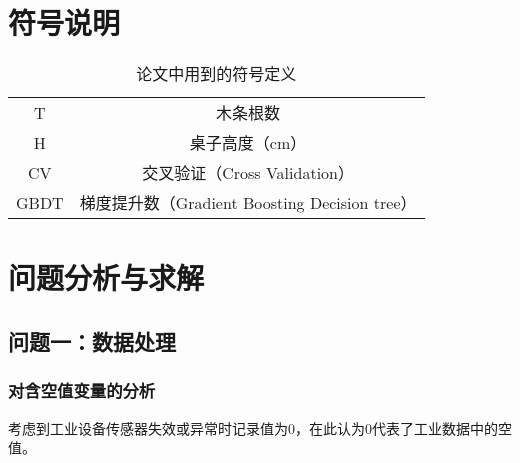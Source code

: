 \documentclass[bwprint]{gmcmthesis}
\begin{document}
\FloatBarrier
\section{符号说明}


\begin{table}[hp]
    \centering
    \caption{论文中用到的符号定义}
	\begin{tabular}{cc}
	\toprule
	 \makebox[0.4\textwidth][c]{符号}	&  \makebox[0.5\textwidth][c]{意义} \\ 
	 \midrule
	 T	    & 木条根数   \\
	 H	    & 桌子高度（cm）  \\
	 \midrule
	 CV	    & 交叉验证（Cross Validation） \\
	 GBDT	& 梯度提升数（Gradient Boosting Decision tree）  \\ 
	 \bottomrule
	\end{tabular}
    \label{tab:addlabel}%
\end{table}%




\FloatBarrier
\section{问题分析与求解}
\FloatBarrier
\subsection{问题一：数据处理}\label{sec:data-process}


%
%


\FloatBarrier
\subsubsection{对含空值变量的分析}\label{sec:empty-analyze}

考虑到工业设备传感器失效或异常时记录值为0，在此认为0代表了工业数据中的空值。
\end{document}
